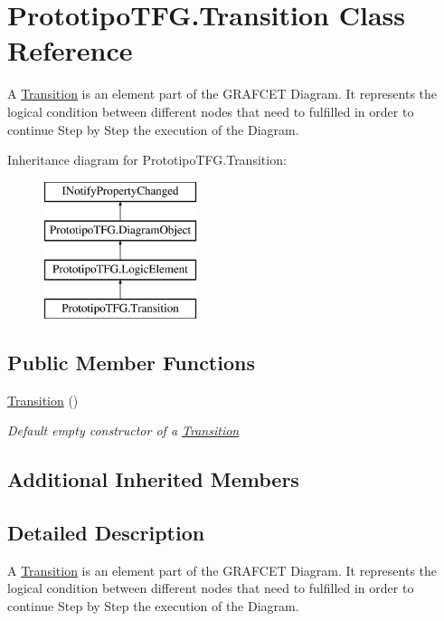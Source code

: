\hypertarget{class_prototipo_t_f_g_1_1_transition}{}\section{Prototipo\+T\+F\+G.\+Transition Class Reference}
\label{class_prototipo_t_f_g_1_1_transition}


A \hyperlink{class_prototipo_t_f_g_1_1_transition}{Transition} is an element part of the G\+R\+A\+F\+C\+E\+T Diagram. It represents the logical condition between different nodes that need to fulfilled in order to continue Step by Step the execution of the Diagram.  


Inheritance diagram for Prototipo\+T\+F\+G.\+Transition\+:\begin{figure}[H]
\begin{center}
\leavevmode
\includegraphics[height=4.000000cm]{class_prototipo_t_f_g_1_1_transition}
\end{center}
\end{figure}
\subsection*{Public Member Functions}
\begin{DoxyCompactItemize}
\item 
\hyperlink{class_prototipo_t_f_g_1_1_transition_ac336a95f326ad085f42d51acb0df02ef}{Transition} ()
\begin{DoxyCompactList}\small\item\em Default empty constructor of a \hyperlink{class_prototipo_t_f_g_1_1_transition}{Transition} \end{DoxyCompactList}\end{DoxyCompactItemize}
\subsection*{Additional Inherited Members}


\subsection{Detailed Description}
A \hyperlink{class_prototipo_t_f_g_1_1_transition}{Transition} is an element part of the G\+R\+A\+F\+C\+E\+T Diagram. It represents the logical condition between different nodes that need to fulfilled in order to continue Step by Step the execution of the Diagram. 



